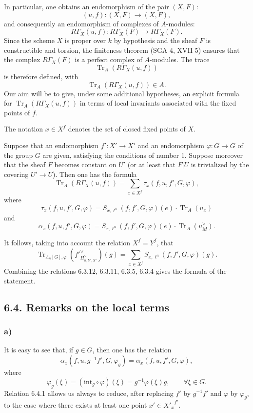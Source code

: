 \documentclass[11pt]{article}
\providecommand{\Tr}{\operatorname{Tr}}
\providecommand{\Tr}{\operatorname{Tr}}
\providecommand{\Tr}{\operatorname{Tr}}
\providecommand{\Tr}{\operatorname{Tr}}
\providecommand{\La}{\Lambda}
\providecommand{\Tr}{\operatorname{Tr}}
\begin{document}
In particular, one obtains an endomorphism of the pair $(X,F)$:
\[
(u,f):(X,F)\longrightarrow (X,F),
\]
and consequently an endomorphism of complexes of $A$-modules:
\[
R\Gamma_X(u,f):R\Gamma_X(F)\longrightarrow R\Gamma_X(F).
\]
Since the scheme $X$ is proper over $k$ by hypothesis and the sheaf $F$ is constructible and torsion, the finiteness theorem (SGA 4, XVII 5) ensures that the complex $R\Gamma_X(F)$ is a perfect complex of $A$-modules. The trace
\[
\Tr_A(R\Gamma_X(u,f))
\]
is therefore defined, with
\[
\Tr_A(R\Gamma_X(u,f))\in A.
\]
Our aim will be to give, under some additional hypotheses, an explicit formula for $\Tr_A(R\Gamma_X(u,f))$ in terms of local invariants associated with the fixed points of $f$.

The notation $x\in X^f$ denotes the set of closed fixed points of $X$.

\bigskip
Suppose that an endomorphism $f':X'\to X'$ and an endomorphism $\varphi:G\to G$ of the group $G$ are given, satisfying the conditions of number 1. Suppose moreover that the sheaf $F$ becomes constant on $U'$ (or at least that $F|U$ is trivialized by the covering $U'\to U$). Then one has the formula
\begin{equation}\tag{6.2}
\Tr_A(R\Gamma_X(u,f))=\sum_{x\in X^f}\tau_x(f,u,f',G,\varphi),
\end{equation}
where
\begin{equation}\tag{6.3}
\tau_x(f,u,f',G,\varphi)=S_{x,\ell^n}(f,f',G,\varphi)(e)\cdot \Tr_A(u_x)
\end{equation}
and
\begin{equation}\tag{6.4}
\alpha_x(f,u,f',G,\varphi)=S_{x,\ell^n}(f,f',G,\varphi)(e)\cdot \Tr_A(u_M^\vee).
\end{equation}

\bigskip

It follows, taking into account the relation $X^f=Y^f$, that
\begin{equation}\tag{6.3.12}
\Tr_{\La_n[G],\varphi}(f'^\vee_{H_{n,U',X'}^\vee})(g)
=
\sum_{x\in X^f}S_{x,\ell^n}(f,f',G,\varphi)(g).
\end{equation}
Combining the relations 6.3.12, 6.3.11, 6.3.5, 6.3.4 gives the formula of the statement.

\subsection*{6.4. Remarks on the local terms}
\subsubsection*{a)} It is easy to see that, if $g\in G$, then one has the relation
\begin{equation}\tag{6.4.1}
\alpha_x(f,u,g^{-1}f',G,\varphi_g)
=
\alpha_x(f,u,f',G,\varphi),
\end{equation}
where
\begin{equation}\tag{6.4.2}
\varphi_g(\xi)=(\mathrm{int}_g\circ\varphi)(\xi)=g^{-1}\varphi(\xi)g,
\qquad \forall\xi\in G.
\end{equation}
Relation 6.4.1 allows us always to reduce, after replacing $f'$ by $g^{-1}f'$ and $\varphi$ by $\varphi_g$, to the case where there exists at least one point $x'\in {X'_x}^{f'}$.
\end{document}
